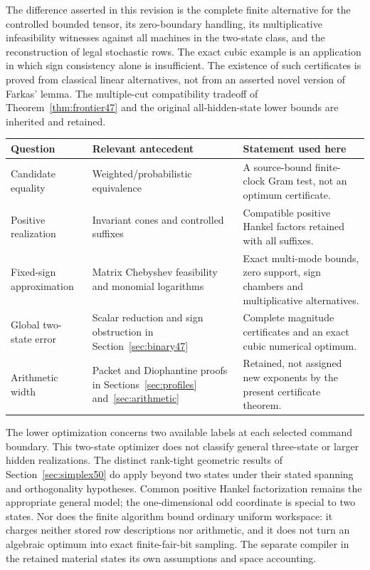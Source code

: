 The difference asserted in this revision is the complete finite
alternative for the controlled bounded tensor, its zero-boundary
handling, its multiplicative infeasibility witnesses against all
machines in the two-state class, and the reconstruction of legal
stochastic rows. The exact cubic example is an application in which
sign consistency alone is insufficient. The existence of such
certificates is proved from classical linear alternatives, not from
an asserted novel version of Farkas' lemma. The multiple-cut
compatibility tradeoff of Theorem~\ref{thm:frontier47} and the original
all-hidden-state lower bounds are inherited and retained.

\begin{center}
\small
\begin{tabular}{p{}p{}p{}}
\toprule
Question & Relevant antecedent & Statement used here\\\midrule
Candidate equality & Weighted/probabilistic equivalence
\cite{Tzeng92,BPP15} & A source-bound finite-clock Gram test, not an optimum certificate.\\[3pt]
Positive realization & Invariant cones and controlled suffixes
\cite{BF03,BF04} & Compatible positive Hankel factors retained with all suffixes.\\[3pt]
Fixed-sign approximation & Matrix Chebyshev feasibility
\cite{GS19} and monomial logarithms \cite{BKVH07} & Exact multi-mode bounds, zero support, sign chambers and multiplicative alternatives.\\[3pt]
Global two-state error & Scalar reduction and sign obstruction in
Section~\ref{sec:binary47} & Complete magnitude certificates and an exact cubic numerical optimum.\\[3pt]
Arithmetic width & Packet and Diophantine proofs in
Sections~\ref{sec:profiles} and~\ref{sec:arithmetic} & Retained, not assigned new exponents by the present certificate theorem.\\
\bottomrule
\end{tabular}
\end{center}

The lower optimization concerns two available labels at each selected
command boundary. This two-state optimizer does not classify general three-state or larger hidden realizations. The distinct rank-tight geometric results of Section~\ref{sec:simplex50} do apply beyond two states under their stated spanning and orthogonality hypotheses. Common positive Hankel factorization remains the
appropriate general model; the one-dimensional odd coordinate is
special to two states. Nor does the finite algorithm bound ordinary
uniform workspace: it charges neither stored row descriptions nor
arithmetic, and it does not turn an algebraic optimum into exact
finite-fair-bit sampling. The separate compiler in the retained
material states its own assumptions and space accounting.
